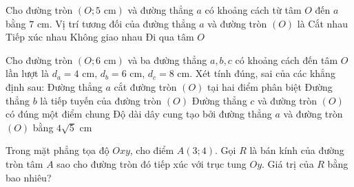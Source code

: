 

\begin{ex}%
	Cho đường tròn $(O; 5\text{ cm})$ và đường thẳng $a$ có khoảng cách từ tâm $O$ đến $a$ bằng $7\text{ cm}$. Vị trí tương đối của đường thẳng $a$ và đường tròn $(O)$ là
	\choice
	{Cắt nhau}
	{Tiếp xúc nhau}
	{\True Không giao nhau}
	{Đi qua tâm $O$}
\end{ex}

\begin{ex}%
	Cho đường tròn $(O; 6\text{ cm})$ và ba đường thẳng $a, b, c$ có khoảng cách đến tâm $O$ lần lượt là $d_a = 4\text{ cm}$, $d_b = 6\text{ cm}$, $d_c = 8\text{ cm}$. Xét tính đúng, sai của các khẳng định sau:
	\choiceTF
	{\True Đường thẳng $a$ cắt đường tròn $(O)$ tại hai điểm phân biệt}
	{\True Đường thẳng $b$ là tiếp tuyến của đường tròn $(O)$}
	{Đường thẳng $c$ và đường tròn $(O)$ có đúng một điểm chung}
	{\True Độ dài dây cung tạo bởi đường thẳng $a$ và đường tròn $(O)$ bằng $4\sqrt{5}\text{ cm}$}
\end{ex}

\begin{bt}%
	Trong mặt phẳng tọa độ $Oxy$, cho điểm $A(3; 4)$. Gọi $R$ là bán kính của đường tròn tâm $A$ sao cho đường tròn đó tiếp xúc với trục tung $Oy$. Giá trị của $R$ bằng bao nhiêu?
\end{bt}

